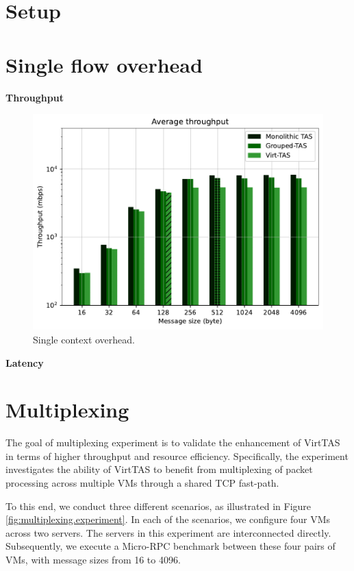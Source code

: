 \section{Setup}

\section{Single flow overhead}

\textbf{Throughput}

\begin{figure}
    \centering
    \includegraphics[scale=0.8]{../results/overhead.throughput.pdf}
    \caption{Single context overhead.}
    \label{fig:overhead.throughput}
\end{figure}

\textbf{Latency}





\section{Multiplexing}

The goal of multiplexing experiment is to validate the enhancement of VirtTAS in terms of 
higher throughput and resource efficiency. Specifically, the experiment 
investigates the ability of VirtTAS to benefit from multiplexing of packet processing 
across multiple VMs through a shared TCP fast-path. 

To this end, we conduct three different scenarios, as illustrated in Figure 
\ref{fig:multiplexing.experiment}. In each of the scenarios, we configure four 
VMs across two servers. The servers in this experiment are interconnected directly. 
Subsequently, we execute a Micro-RPC benchmark between these four pairs of VMs, 
with message sizes from 16 to 4096.


